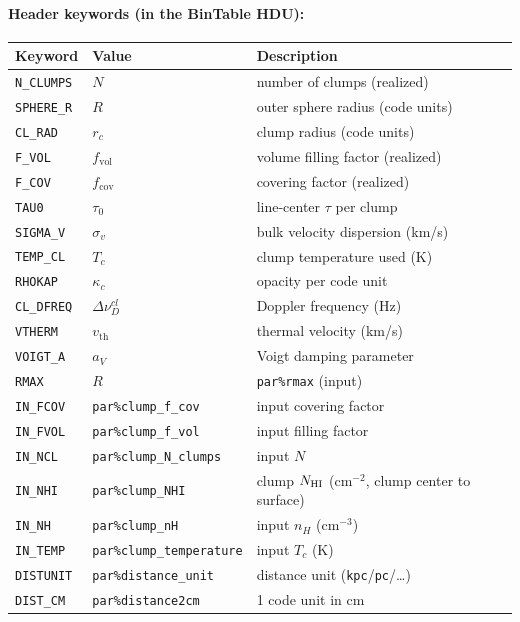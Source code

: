 \documentclass[english,a4paper]{my_memo}
\begin{document}
\paragraph{Header keywords (in the BinTable HDU):}
\begin{center}
\begin{tabular}{lll}
\hline
Keyword & Value & Description \\
\hline
\texttt{N\_CLUMPS} & $N$ & number of clumps (realized) \\
\texttt{SPHERE\_R} & $R$ & outer sphere radius (code units) \\
\texttt{CL\_RAD}   & $r_c$ & clump radius (code units) \\
\texttt{F\_VOL}    & $f_\mathrm{vol}$ & volume filling factor (realized) \\
\texttt{F\_COV}    & $f_\mathrm{cov}$ & covering factor (realized) \\
\texttt{TAU0}      & $\tau_0$ & line-center $\tau$ per clump \\
\texttt{SIGMA\_V}  & $\sigma_v$ & bulk velocity dispersion (km/s) \\
\texttt{TEMP\_CL}  & $T_c$ & clump temperature used (K) \\
\texttt{RHOKAP}    & $\kappa_c$ & opacity per code unit \\
\texttt{CL\_DFREQ} & $\Delta\nu_D^{cl}$ & Doppler frequency (Hz) \\
\texttt{VTHERM}    & $v_\mathrm{th}$ & thermal velocity (km/s) \\
\texttt{VOIGT\_A}  & $a_V$ & Voigt damping parameter \\
\texttt{RMAX}      & $R$ & \texttt{par\%rmax} (input) \\
\texttt{IN\_FCOV}  & \texttt{par\%clump\_f\_cov} & input covering factor \\
\texttt{IN\_FVOL}  & \texttt{par\%clump\_f\_vol} & input filling factor \\
\texttt{IN\_NCL}   & \texttt{par\%clump\_N\_clumps} & input $N$ \\
\texttt{IN\_NHI}   & \texttt{par\%clump\_NHI} & clump $N_{\rm HI}$ (cm$^{-2}$, clump center to surface) \\
\texttt{IN\_NH}    & \texttt{par\%clump\_nH} & input $n_H$ (cm$^{-3}$) \\
\texttt{IN\_TEMP}  & \texttt{par\%clump\_temperature} & input $T_c$ (K) \\
\texttt{DISTUNIT}  & \texttt{par\%distance\_unit} & distance unit (\texttt{kpc}/\texttt{pc}/\dots) \\
\texttt{DIST\_CM}  & \texttt{par\%distance2cm} & 1 code unit in cm \\
\hline
\end{tabular}
\end{center}
\end{document}
